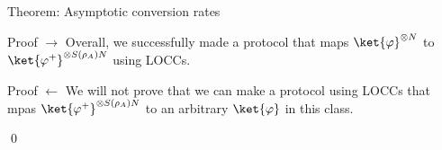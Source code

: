 \documentclass[a4paper]{article}
\begin{document}
\begin{parag}{Theorem: Asymptotic conversion rates}
\begin{subparag}{Proof $\to$}
        Overall, we successfully made a protocol that maps $\ket{\phi}^{\otimes N}$ to $\ket{\phi^+}^{\otimes S\left(\rho_A\right)N}$ using LOCCs. 
    \end{subparag}

    \begin{subparag}{Proof $\leftarrow$}
        We will not prove that we can make a protocol using LOCCs that mpas $\ket{\phi^+}^{\otimes S\left(\rho_A\right)N}$ to an arbitrary $\ket{\phi}$ in this class.

        \qed
    \end{subparag}
\end{parag}
 
\end{document}
